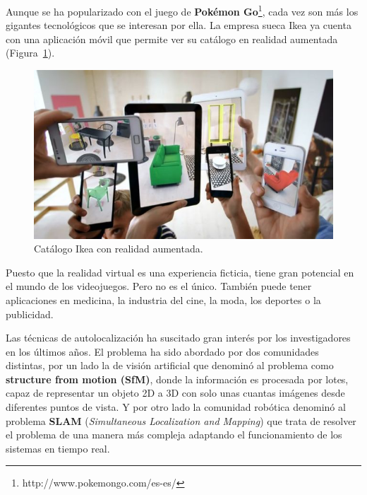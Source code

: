 Aunque se ha popularizado con el juego de \textbf{Pokémon Go}\footnote{http://www.pokemongo.com/es-es/}, cada vez son más los gigantes tecnológicos que se interesan por ella. La empresa sueca Ikea ya cuenta con una aplicación móvil que permite ver su catálogo en realidad aumentada (Figura~\ref{fig:Ikea}).

\begin{figure}[th]
\centering
\includegraphics[scale=0.7]{Figures/ikea.jpg}
\decoRule
\caption[Ikea con realidad aumentada]{Catálogo Ikea con realidad aumentada.}
\label{fig:Ikea}
\end{figure}

Puesto que la realidad virtual es una experiencia ficticia, tiene gran potencial en el mundo de los videojuegos. Pero no es el único. También puede tener aplicaciones en medicina, la industria del cine, la moda, los deportes o la publicidad.


Las técnicas de autolocalización ha suscitado gran interés por los investigadores en los últimos años. El problema ha sido abordado por dos comunidades distintas, por un lado la de visión artificial que denominó al problema como \textbf{structure from motion (SfM)}, donde la información es procesada por lotes, capaz de representar un objeto 2D a 3D con solo unas cuantas imágenes desde diferentes puntos de vista. Y por otro lado la comunidad robótica denominó al problema \textbf{SLAM} (\textit{Simultaneous Localization and Mapping}) que trata de resolver el problema de una manera más compleja adaptando el funcionamiento de los sistemas en tiempo real.

